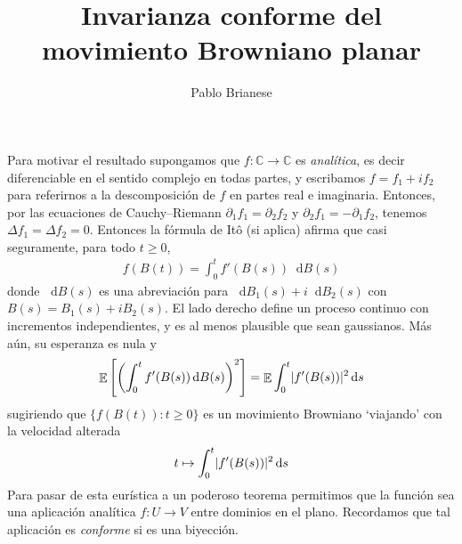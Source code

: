 \documentclass{article}
\title{Invarianza conforme del movimiento Browniano planar}
\author{Pablo Brianese}
\newcommand{\ito}{Itô}
\newcommand{\dd}{\mathop{}\!\mathrm{d}}
\newcommand{\complexNumbers}{\mathbb{C}}
\DeclareMathOperator{\Expectation}{\mathbb{E}}
\DeclarePairedDelimiter{\abs}{\lvert}{\rvert}
\theoremstyle{plain}
\theoremstyle{remark}
\theoremstyle{definition}
\begin{document}
\maketitle


Para motivar el resultado supongamos que \(f : \complexNumbers \rightarrow \complexNumbers\) es \emph{analítica}, es decir diferenciable en el sentido complejo en todas partes, y escribamos \(f = f_1 + i f_2\) para referirnos a la descomposición de \(f\) en partes real e imaginaria.
Entonces, por las ecuaciones de Cauchy--Riemann \(\partial_1 f_1 = \partial_2 f_2\) y \(\partial_2 f_1 = - \partial_1 f_2\), tenemos \(\Delta f_1 = \Delta f_2 = 0\).
Entonces la fórmula de \ito{} (si aplica) afirma que casi seguramente, para todo \(t \geq 0\),
\begin{align}
  f(B(t))
  =
  \int_0^t f'(B(s)) \dd B(s)
\end{align}
donde \(\dd B(s)\) es una abreviación para \(\dd B_1(s) + i \dd B_2(s)\) con \(B(s) = B_1(s) + i B_2(s)\).
El lado derecho define un proceso continuo con incrementos independientes, y es al menos plausible que sean gaussianos.
Más aún, su esperanza es nula y
\begin{align}
  \Expectation \left[ \left( \int_0^t f'(B(s)) \dd B(s) \right)^2 \right]
  =
  \Expectation \int_0^t \abs{f'(B(s))}^2 \dd s
\end{align}
sugiriendo que \(\{f(B(t)) : t \geq 0\}\) es un movimiento Browniano `viajando' con la velocidad alterada
\begin{align}
  t
  \mapsto
  \int_0^t \abs{f'(B(s))}^2 \dd s
\end{align}
Para pasar de esta eurística a un poderoso teorema permitimos que la función sea una aplicación analítica \(f : U \rightarrow V\) entre dominios en el plano.
Recordamos que tal aplicación es \emph{conforme} si es una biyección.
\end{document}
